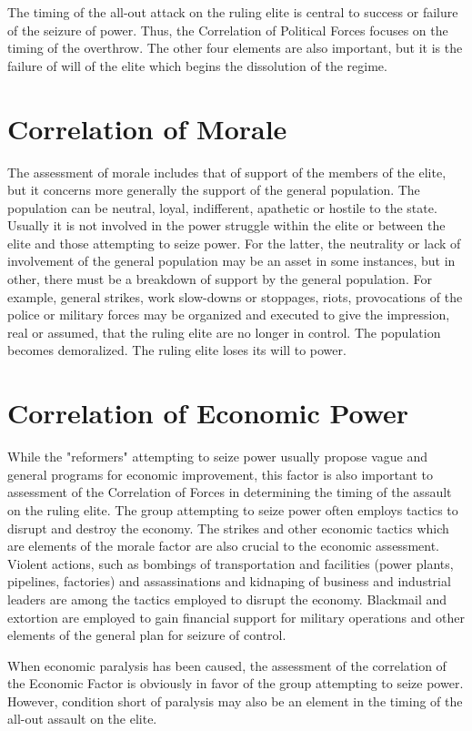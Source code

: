 The timing of the all-out attack on the ruling elite is central to success or failure of the seizure of power. Thus, the Correlation of Political Forces focuses on the timing of the overthrow. The other four elements are also important, but it is the failure of will of the elite which begins the dissolution of the regime.

\section{Correlation of Morale}
The assessment of morale includes that of support of the members of the elite, but it concerns more generally the support of the general population. The population can be neutral, loyal, indifferent, apathetic or hostile to the state. Usually it is not involved in the power struggle within the elite or between the elite and those attempting to seize power. For the latter, the neutrality or lack of involvement of the general population may be an asset in some instances, but in other, there must be a breakdown of support by the general population. For example, general strikes, work slow-downs or stoppages, riots, provocations of the police or military forces may be organized and executed to give the impression, real or assumed, that the ruling elite are no longer in control. The population becomes demoralized. The ruling elite loses its will to power.

\section{Correlation of Economic Power}
While the "reformers" attempting to seize power usually propose vague and general programs for economic improvement, this factor is also important to assessment of the Correlation of Forces in determining the timing of the assault on the ruling elite. The group attempting to seize power often employs tactics to disrupt and destroy the economy. The strikes and other economic tactics which are elements of the morale factor are also crucial to the economic assessment. Violent actions, such as bombings of transportation and facilities (power plants, pipelines, factories) and assassinations and kidnaping of business and industrial leaders are among the tactics employed to disrupt the economy. Blackmail and extortion are employed to gain financial support for military operations and other elements of the general plan for seizure of control.

When economic paralysis has been caused, the assessment of the correlation of the Economic Factor is obviously in favor of the group attempting to seize power. However, condition short of paralysis may also be an element in the timing of the all-out assault on the elite.

